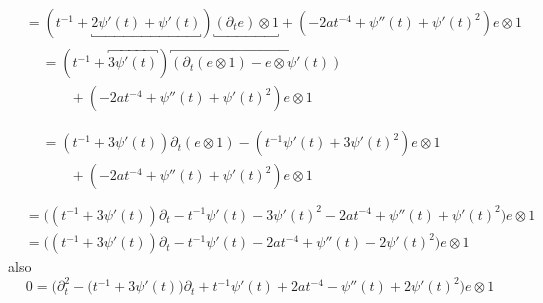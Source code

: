 \begin{try}
\begin{align*}
  &= (t^{-1} + \underbracket{2\psi'(t) + \psi'(t)})
    \underbracket{(\partial_t e)\otimes 1}
    + (- 2at^{-4} + \psi''(t) + \psi'(t)^2) e\otimes 1 \\
  &\begin{aligned}
    &= (t^{-1} + \overbracket{3\psi'(t)})\overbracket{(\partial_t (e\otimes 1)
    - e\otimes \psi'(t))}\\
    &\qquad + (- 2at^{-4} + \psi''(t) + \psi'(t)^2) e\otimes 1 \\
  \end{aligned} \\
  &\begin{aligned}
    &= (t^{-1} + 3\psi'(t))\partial_t (e\otimes 1)
    - (t^{-1} \psi'(t) + 3\psi'(t)^2)e\otimes 1\\
    &\qquad + (- 2at^{-4} + \psi''(t) + \psi'(t)^2) e\otimes 1 \\
  \end{aligned} \\
  &= \Big((t^{-1} + 3\psi'(t))\partial_t
    - t^{-1} \psi'(t) - 3\psi'(t)^2 - 2at^{-4} + \psi''(t)
    + \psi'(t)^2\Big) e\otimes 1 \\
  &= \Big((t^{-1} + 3\psi'(t))\partial_t
    - t^{-1} \psi'(t) - 2at^{-4} + \psi''(t)
    - 2 \psi'(t)^2\Big) e\otimes 1
\end{align*}
also
\[
0 = \Big(\partial_t^2 - \big(t^{-1} + 3\psi'(t)\big)\partial_t
    + t^{-1} \psi'(t) + 2at^{-4} -\psi''(t)
    + 2 \psi'(t)^2\Big) e\otimes 1
\]
\begin{comment}
\begin{try}
und somit mit $\psi(t)=i\sqrt{2a}t^2$ ist $\psi'(t)=2i\sqrt{2a}t$ und
$\psi''(t)=2i\sqrt{2a}$. Also
\begin{align*}
0 &= \Big(\partial_t^2 - \big(t^{-1} + 3\psi'(t)\big)\partial_t
    + t^{-1} \psi'(t) + 2at^{-4} -\psi''(t)
    + 2 \psi'(t)^2\Big) e\otimes 1
\\&= \Big(\partial_t^2 - \big(t^{-1} + 6i\sqrt{2a}t\big)\partial_t
    + \underbracket{t^{-1} 2i\sqrt{2a}t} + 2at^{-4} - 2i\sqrt{2a}
    + \underbracket{2 (2i\sqrt{2a}t)^2}\Big) e\otimes 1
\\&= \Big(\partial_t^2 - \big(t^{-1} + 6i\sqrt{2a}t\big)\partial_t
    + \overbracket{2i\sqrt{2a}} + 2at^{-4} - 2i\sqrt{2a}
    - \overbracket{8 (2a) t^2}\Big) e\otimes 1
\\&= \Big(\partial_t^2 - \big(t^{-1} + 6i\sqrt{2a}t\big)\partial_t
    + 2at^{-4} - 16a t^2\Big) e\otimes 1
\end{align*}
\begin{figure}[H]

\end{comment}
\end{try}
